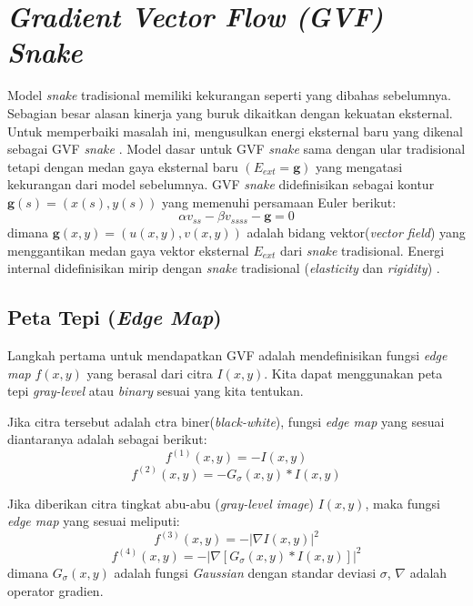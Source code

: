 \section{\emph{Gradient Vector Flow (GVF) Snake}}
Model \emph{snake} tradisional memiliki kekurangan seperti yang dibahas sebelumnya. Sebagian besar alasan kinerja yang buruk dikaitkan dengan kekuatan eksternal. Untuk memperbaiki masalah ini, \citep{xu1998snakes:22} mengusulkan energi eksternal baru yang dikenal sebagai GVF \emph{snake} . Model dasar untuk GVF \emph{snake} sama dengan ular tradisional tetapi dengan medan gaya eksternal baru $(E_{ext} = \textbf{g})$ yang mengatasi kekurangan dari model sebelumnya. GVF \emph{snake} didefinisikan sebagai kontur $\textbf{g}(s) = (x (s), y (s))$ yang memenuhi persamaan Euler berikut:
\begin{equation}
	\label{gvfsnake}
	\alpha v_{ss} - \beta v_{ssss} - \textbf{g} = 0
\end{equation}
dimana $\textbf{g}(x, y) = (u (x, y), v (x, y))$ adalah bidang vektor(\emph{vector field}) yang menggantikan medan gaya vektor eksternal $E_{ext}$ dari \emph{snake} tradisional. Energi internal didefinisikan mirip dengan \emph{snake} tradisional (\emph{elasticity} dan \emph{rigidity}) \citep{abdullah2016robust}.

\subsection{Peta Tepi (\emph{Edge Map})}
Langkah pertama untuk mendapatkan GVF adalah mendefinisikan fungsi \emph{edge map} $f(x,y)$ yang berasal dari citra $I(x,y)$. Kita dapat menggunakan peta tepi \emph{gray-level} atau \emph{binary} sesuai yang kita tentukan.

Jika citra tersebut adalah ctra biner(\emph{black-white}), fungsi \emph{edge map} yang sesuai diantaranya adalah sebagai berikut:
\begin{equation}
	\label{eext3}
	f^{(1)}(x,y) = - I(x,y)
\end{equation}
\begin{equation}
	\label{eext4}
	f^{(2)}(x,y) = - G_{\sigma} (x,y) * I(x,y)
\end{equation}

Jika diberikan citra tingkat abu-abu (\emph{gray-level image}) $I (x, y)$, maka fungsi \emph{edge map} yang sesuai meliputi:
\begin{equation}
	\label{eext1}
	f^{(3)}(x,y) = -|\nabla I(x,y)|^2
\end{equation}
\begin{equation}
	\label{eext2}
	f^{(4)}(x,y) = -|\nabla \left[ G_{\sigma} (x,y) * I(x,y) \right]|^2
\end{equation}
dimana $G_{\sigma}(x,y)$ adalah fungsi \emph{Gaussian} dengan standar deviasi $\sigma$, $\nabla$ adalah operator gradien.


